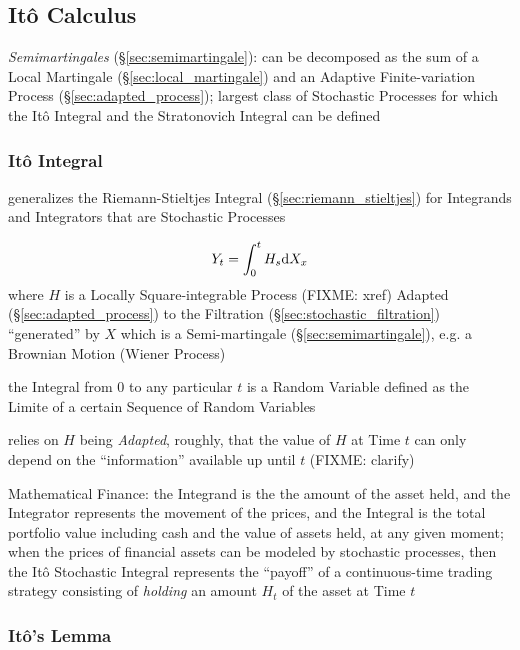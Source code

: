 {%
\subsection{It\^o Calculus}\label{sec:ito_calculus}

\emph{Semimartingales} (\S\ref{sec:semimartingale}): can be decomposed as the
sum of a Local Martingale (\S\ref{sec:local_martingale}) and an Adaptive
Finite-variation Process (\S\ref{sec:adapted_process});
largest class of Stochastic Processes for which the It\^o Integral and the
Stratonovich Integral can be defined



\subsubsection{It\^o Integral}\label{sec:ito_integral}

generalizes the Riemann-Stieltjes Integral (\S\ref{sec:riemann_stieltjes}) for
Integrands and Integrators that are Stochastic Processes

\[
  Y_t = \int_0^t H_s \mathrm{d}X_x
\]
where $H$ is a Locally Square-integrable Process (FIXME: xref) Adapted
(\S\ref{sec:adapted_process}) to the Filtration
(\S\ref{sec:stochastic_filtration}) ``generated'' by $X$ which is a
Semi-martingale (\S\ref{sec:semimartingale}), e.g. a Brownian Motion (Wiener
Process)

the Integral from $0$ to any particular $t$ is a Random Variable defined as the
Limite of a certain Sequence of Random Variables

relies on $H$ being \emph{Adapted}, roughly, that the value of $H$ at Time $t$
can only depend on the ``information'' available up until $t$ (FIXME: clarify)

Mathematical Finance: the Integrand is the the amount of the asset held, and the
Integrator represents the movement of the prices, and the Integral is the total
portfolio value including cash and the value of assets held, at any given
moment; when the prices of financial assets can be modeled by stochastic
processes, then the It\^o Stochastic Integral represents the ``payoff'' of a
continuous-time trading strategy consisting of \emph{holding} an amount $H_t$ of
the asset at Time $t$



\subsubsection{It\^o's Lemma}\label{sec:itos_lemma}

}
